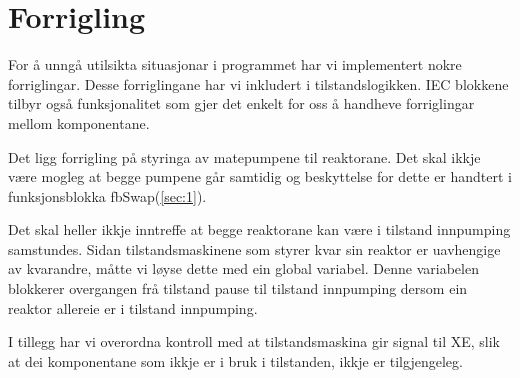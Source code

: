\section{Forrigling}
\thispagestyle{fancy}

For å unngå utilsikta situasjonar i programmet har vi implementert nokre forriglingar.
Desse forriglingane har vi inkludert i tilstandslogikken.\newline
\gls{IEC} blokkene tilbyr også funksjonalitet som gjer det enkelt for oss å handheve forriglingar mellom komponentane.

Det ligg forrigling på styringa av matepumpene til reaktorane. Det skal ikkje være mogleg at begge pumpene går samtidig
og beskyttelse for dette er handtert i funksjonsblokka fbSwap(\ref{sec:1}).

Det skal heller ikkje inntreffe at begge reaktorane kan være i tilstand innpumping samstundes.
Sidan tilstandsmaskinene som styrer kvar sin reaktor er uavhengige av kvarandre, måtte vi løyse dette med ein
global variabel. Denne variabelen blokkerer overgangen frå tilstand pause til tilstand innpumping dersom ein reaktor allereie er i tilstand innpumping.

I tillegg har vi overordna kontroll med at tilstandsmaskina gir signal til \gls{XE}, 
slik at dei komponentane som ikkje er i bruk i tilstanden, ikkje er tilgjengeleg.

\newpage









